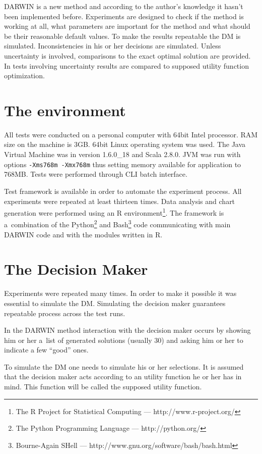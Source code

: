 DARWIN is a new method and according to the author's knowledge it hasn't been
implemented before. Experiments are designed to check if the method is working
at all, what parameters are important for the method and what should be their
reasonable default values. To make the results repeatable the DM is
simulated. Inconsistencies in his or her decisions are simulated. Unless
uncertainty is involved, comparisons to the exact optimal solution are
provided. In tests involving uncertainty results are compared to supposed
utility function optimization.

\section{The environment}

All tests were conducted on a personal computer with 64bit Intel
processor. RAM size on the machine is 3GB. 64bit Linux operating system was
used. The Java Virtual Machine was in version 1.6.0\_18 and Scala 2.8.0. JVM
was run with options \texttt{-Xms768m -Xmx768m} thus setting memory available
for application to 768MB. Tests were performed through CLI batch interface.

Test framework is available in order to automate the experiment process. All
experiments were repeated at least thirteen times. Data analysis and chart
generation were performed using an R environment\footnote{The R Project for
  Statistical Computing --- http://www.r-project.org/}. The framework is
a~combination of the Python\footnote{The Python Programming Language ---
  http://python.org/} and Bash\footnote{Bourne-Again SHell ---
  http://www.gnu.org/software/bash/bash.html} code communicating with main
DARWIN code and with the modules written in R.

\section{The Decision Maker}

Experiments were repeated many times. In order to make it possible it was
essential to simulate the DM. Simulating the decision maker guarantees
repeatable process across the test runs.

In the DARWIN method interaction with the decision maker occurs by showing him
or her a~list of generated solutions (usually 30) and asking him or her to
indicate a few ``good'' ones.

To simulate the DM one needs to simulate his or her selections. It is assumed
that the decision maker acts according to an utility function he or her has in
mind. This function will be called the supposed utility function.

